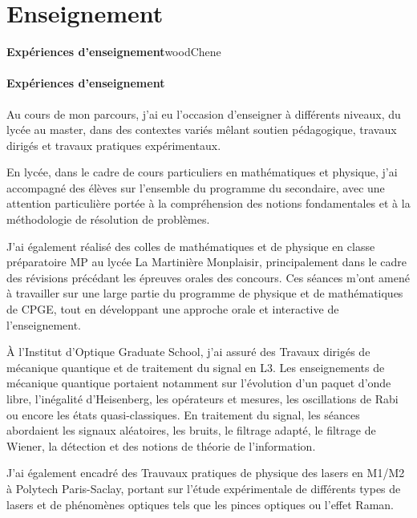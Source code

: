\newpage

\section{Enseignement}

\EncadreDeux
{}{{\bf \textsf{Expériences d’enseignement}}}{woodChene}{
    \paragraph{Expériences d’enseignement}

    Au cours de mon parcours, j’ai eu l’occasion d’enseigner à différents niveaux,
    du lycée au master, dans des contextes variés mêlant soutien pédagogique,
    travaux dirigés et travaux pratiques expérimentaux.

    En lycée, dans le cadre de cours particuliers en mathématiques et physique,
    j’ai accompagné des élèves sur l’ensemble du programme du secondaire, avec une
    attention particulière portée à la compréhension des notions fondamentales et à
    la méthodologie de résolution de problèmes.

    J’ai également réalisé des colles de mathématiques et de physique en classe
    préparatoire MP au lycée La Martinière Monplaisir, principalement dans le cadre
    des révisions précédant les épreuves orales des concours. Ces séances m’ont
    amené à travailler sur une large partie du programme de physique et de
    mathématiques de CPGE, tout en développant une approche orale et interactive de
    l’enseignement.

    À l’Institut d’Optique Graduate School, j’ai assuré des Travaux dirigés de mécanique
    quantique et de traitement du signal en L3. Les enseignements de mécanique
    quantique portaient notamment sur l’évolution d’un paquet d’onde libre,
    l’inégalité d’Heisenberg, les opérateurs et mesures, les oscillations de Rabi
    ou encore les états quasi-classiques. En traitement du signal, les séances
    abordaient les signaux aléatoires, les bruits, le filtrage adapté, le filtrage
    de Wiener, la détection et des notions de théorie de l’information.

    J’ai également encadré des Trauvaux pratiques de physique des lasers en M1/M2 à
    Polytech Paris-Saclay, portant sur l’étude expérimentale de différents types de
    lasers et de phénomènes optiques tels que les pinces optiques ou l’effet Raman.
}

\vspace{-0.0cm}

